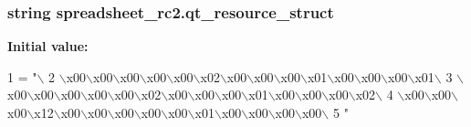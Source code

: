 \subsubsection[{qt\+\_\+resource\+\_\+struct}]{\setlength{\rightskip}{0pt plus 5cm}string spreadsheet\+\_\+rc2.\+qt\+\_\+resource\+\_\+struct}\label{namespacespreadsheet__rc2_a7d7ce22c6e2d32da03510320882c65ff}
{\bfseries Initial value\+:}
\begin{DoxyCode}
1 = \textcolor{stringliteral}{"\(\backslash\)}
2 \textcolor{stringliteral}{\(\backslash\)x00\(\backslash\)x00\(\backslash\)x00\(\backslash\)x00\(\backslash\)x00\(\backslash\)x02\(\backslash\)x00\(\backslash\)x00\(\backslash\)x00\(\backslash\)x01\(\backslash\)x00\(\backslash\)x00\(\backslash\)x00\(\backslash\)x01\(\backslash\)}
3 \textcolor{stringliteral}{\(\backslash\)x00\(\backslash\)x00\(\backslash\)x00\(\backslash\)x00\(\backslash\)x00\(\backslash\)x02\(\backslash\)x00\(\backslash\)x00\(\backslash\)x00\(\backslash\)x01\(\backslash\)x00\(\backslash\)x00\(\backslash\)x00\(\backslash\)x02\(\backslash\)}
4 \textcolor{stringliteral}{\(\backslash\)x00\(\backslash\)x00\(\backslash\)x00\(\backslash\)x12\(\backslash\)x00\(\backslash\)x00\(\backslash\)x00\(\backslash\)x00\(\backslash\)x00\(\backslash\)x01\(\backslash\)x00\(\backslash\)x00\(\backslash\)x00\(\backslash\)x00\(\backslash\)}
5 \textcolor{stringliteral}{"}
\end{DoxyCode}
